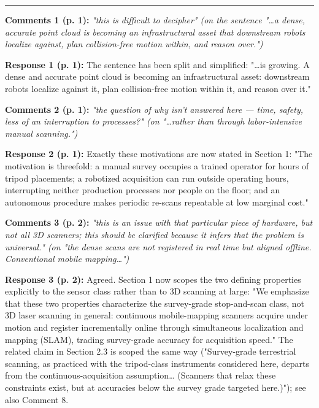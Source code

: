 \documentclass[11pt]{article}
\begin{document}
\medskip\hrule\medskip

\textbf{Comments 1 (p. 1):} \emph{"this is difficult to decipher" \emph{(on the sentence "…a dense, accurate point cloud is becoming an infrastructural asset that downstream robots localize against, plan collision-free motion within, and reason over.")}}

\textbf{Response 1 (p. 1):} The sentence has been split and simplified: "…is growing. A dense and accurate point cloud is becoming an infrastructural asset: downstream robots localize against it, plan collision-free motion within it, and reason over it."

\medskip

\textbf{Comments 2 (p. 1):} \emph{"the question of why isn't answered here — time, safety, less of an interruption to processes?" \emph{(on "…rather than through labor-intensive manual scanning.")}}

\textbf{Response 2 (p. 1):} Exactly these motivations are now stated in Section 1: "The motivation is threefold: a manual survey occupies a trained operator for hours of tripod placements; a robotized acquisition can run outside operating hours, interrupting neither production processes nor people on the floor; and an autonomous procedure makes periodic re-scans repeatable at low marginal cost."

\medskip

\textbf{Comments 3 (p. 2):} \emph{"this is an issue with that particular piece of hardware, but not all 3D scanners; this should be clarified because it infers that the problem is universal." \emph{(on "the dense scans are not registered in real time but aligned offline. Conventional mobile mapping…")}}

\textbf{Response 3 (p. 2):} Agreed. Section 1 now scopes the two defining properties explicitly to the sensor class rather than to 3D scanning at large: "We emphasize that these two properties characterize the survey-grade stop-and-scan class, not 3D laser scanning in general: continuous mobile-mapping scanners acquire under motion and register incrementally online through simultaneous localization and mapping (SLAM), trading survey-grade accuracy for acquisition speed." The related claim in Section 2.3 is scoped the same way ("Survey-grade terrestrial scanning, as practiced with the tripod-class instruments considered here, departs from the continuous-acquisition assumption… (Scanners that relax these constraints exist, but at accuracies below the survey grade targeted here.)"); see also Comment 8.
\end{document}
